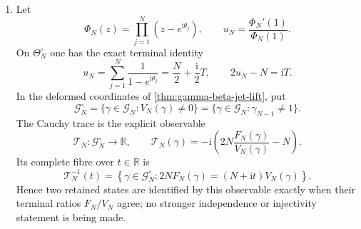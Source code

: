 \begin{theorem}
\begin{enumerate}
 \item Let
 \[
  \Phi_N(z)=\prod_{j=1}^{N}(z-e^{\mathrm i\theta_j}),
  \qquad
  u_N=\frac{\Phi_N'(1)}{\Phi_N(1)}.
 \]
 On $\Theta_N^\circ$ one has the exact terminal identity
 \begin{equation}
  u_N=\sum_{j=1}^{N}\frac{1}{1-e^{\mathrm i\theta_j}}
  =\frac N2+\frac{\mathrm i}{2}T,
  \qquad
  2u_N-N=\mathrm iT.
  \label{eq:winn-terminal-log-derivative}
 \end{equation}
 In the deformed coordinates of \cref{thm:gamma-beta-jet-lift}, put
 \begin{equation}
  \mathcal G_N^\circ
  =\{\gamma\in\mathcal G_N:V_N(\gamma)\ne0\}
  =\{\gamma\in\mathcal G_N:\gamma_{N-1}\ne1\}.
  \label{eq:winn-gamma-open-locus}
 \end{equation}
 The Cauchy trace is the explicit observable
 \begin{equation}
  \mathcal T_N:\mathcal G_N^\circ\longrightarrow\mathbb R,
  \qquad
  \mathcal T_N(\gamma)
  =-\mathrm i\left(2N\frac{F_N(\gamma)}{V_N(\gamma)}-N\right).
  \label{eq:winn-gamma-trace-map}
 \end{equation}
 Its complete fibre over $t\in\mathbb R$ is
 \begin{equation}
  \mathcal T_N^{-1}(t)
  =\left\{\gamma\in\mathcal G_N^\circ:
  2N F_N(\gamma)=(N+\mathrm it)V_N(\gamma)\right\}.
  \label{eq:winn-gamma-trace-fibre}
 \end{equation}
 Hence two retained states are identified by this observable exactly when their terminal
 ratios $F_N/V_N$ agree; no stronger independence or injectivity statement is being made.


\end{enumerate}
\end{theorem}
